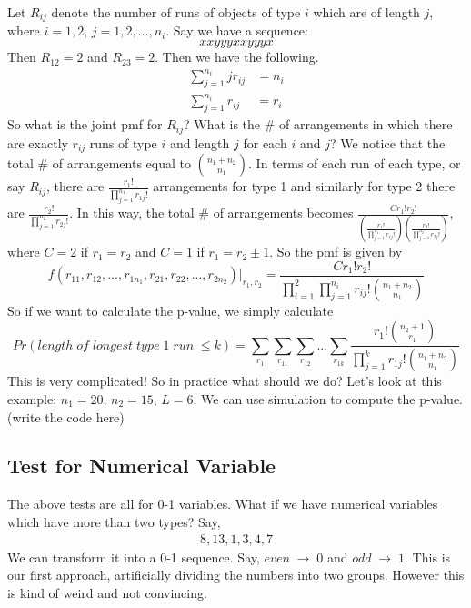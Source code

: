 \documentclass[twoside]{article}
\begin{document}
	Let $R_{ij}$ denote the number of runs of objects of type $i$ which are of length $j$, where $i = 1, 2$, $j = 1, 2, ..., n_i$. Say we have a sequence: 
	$$
	xxyyyxxyyyx
	$$
	Then $R_{12} = 2$ and $R_{23} = 2$. Then we have the following. 
	\begin{align*}
		\sum_{j = 1}^{n_i} j r_{ij} &= n_i \\
		\sum_{j = 1}^{n_i} r_{ij} &= r_i
	\end{align*}
	So what is the joint pmf for $R_{ij}$? What is the \# of arrangements in which there are exactly $r_{ij}$ runs of type $i$ and length $j$ for each $i$ and $j$? We notice that the total \# of arrangements equal to $\binom{n_1 + n_2}{n_1}$. In terms of each run of each type, or say $R_{ij}$, there are $\frac{r_1 !}{\prod_{j=1}^{n_1} r_{1j}!}$ arrangements for type 1 and similarly for type 2 there are $\frac{r_2 !}{\prod_{j=1}^{n_2} r_{2j}!}$. In this way, the total \# of arrangements becomes $\frac{C r_1 ! r_2 !}{\left( \frac{r_1 !}{\prod_{j=1}^{n_1} r_{1j}!} \right) \left( \frac{r_2 !}{\prod_{j=1}^{n_2} r_{2j}!} \right)}$, where $C = 2$ if $r_1 = r_2$ and $C = 1$ if $r_1 = r_2 \pm 1$. So the pmf is given by
	$$
	f(r_{11}, r_{12}, ..., r_{1 n_1}, r_{21}, r_{22}, ..., r_{2 n_2})\big|_{r_1, r_2} = \frac{C r_1 ! r_2 !}{\prod_{i=1}^2 \prod_{j=1}^{n_i} r_{ij}! \binom{n_1 + n_2}{n_1}}
	$$
	So if we want to calculate the p-value, we simply calculate
	$$
	Pr \left( length \; of \; longest\; type \; 1 \; run \; \leqslant k \right) = \sum_{r_1} \sum_{r_{11}} \sum_{r_{12}} ... \sum_{r_{1k}} \frac{r_1 ! \binom{n_2 + 1}{r_1}}{\prod_{j=1}^k r_{1j}! \binom{n_1 + n_2}{n_1}}
	$$
	This is very complicated! So in practice what should we do? Let's look at this example: $n_1 = 20$, $n_2 = 15$, $L = 6$. We can use simulation to compute the p-value. (write the code here)
	
	\subsection{Test for Numerical Variable}
	The above tests are all for 0-1 variables. What if we have numerical variables which have more than two types? Say, 
	\begin{align}
		8, 13, 1, 3, 4, 7 \tag{1}
	\end{align}
	We can transform it into a 0-1 sequence. Say, $even \; \to \; 0$ and $odd \; \to \; 1$. This is our first approach, artificially dividing the numbers into two groups. However this is kind of weird and not convincing. 
	
\end{document}
